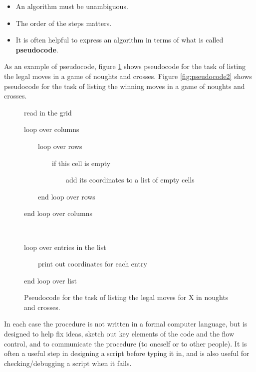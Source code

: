 \vspace{1mm}


\begin{itemize}
\item
An algorithm must be unambiguous.
\item
The order of the steps matters.
\item
It is often helpful to express an algorithm in terms of what is called \textbf{pseudocode}.
\end{itemize}

\noindent
As an example of pseudocode, figure \ref{fig:pseudocode1} shows pseudocode for the task of listing the legal
moves in a game of noughts and crosses. Figure \ref{fig:pseudocode2} shows pseudocode
for the task of listing the winning moves in a game of noughts and crosses.


\begin{figure}
{\tt

read in the grid

loop over columns

\ \ \ \ loop over rows

\ \ \ \ \ \ \ \ if this cell is empty

\ \ \ \ \ \ \ \ \ \ \ \ add its coordinates to a list of empty cells

\ \ \ \ end loop over rows

end loop over columns

\  

loop over entries in the list 

\ \ \ \ print out coordinates for each entry

end loop over list

}
\caption{\label{fig:pseudocode1}
Pseudocode for the task of listing the legal moves for X
in noughts and crosses.
}
\end{figure}

\noindent
In each case the procedure is not written in a formal computer language, 
but is designed to help fix ideas, sketch out key elements of the code and the flow
control, and to communicate the procedure (to oneself or to other people). It is 
often a useful step in designing a script before typing it in, and is also useful for 
checking/debugging  a script when it fails.

